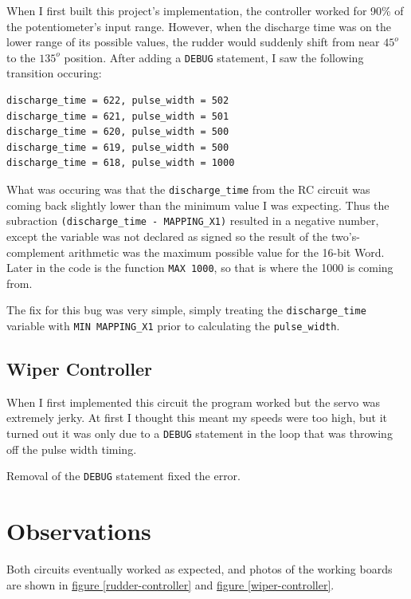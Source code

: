 \documentclass[11pt]{article}
\begin{document}
When I first built this project's implementation, the controller worked
for 90\% of the potentiometer's input range. However, when the discharge
time was on the lower range of its possible values, the rudder would
suddenly shift from near $45^{o}$ to the $135^{o}$ position.
After adding a \texttt{DEBUG} statement, I saw the following transition
occuring:
\begin{verbatim}
discharge_time = 622, pulse_width = 502
discharge_time = 621, pulse_width = 501
discharge_time = 620, pulse_width = 500
discharge_time = 619, pulse_width = 500
discharge_time = 618, pulse_width = 1000
\end{verbatim}

What was occuring was that the \texttt{discharge\_time} from the RC circuit
was coming back slightly lower than the minimum value I was expecting.
Thus the subraction \mbox{\texttt{(discharge\_time - MAPPING\_X1)}} resulted
in a negative number, except the variable was not declared as signed so
the result of the two's-complement arithmetic was the maximum possible
value for the 16-bit Word. Later in the code is the function
\mbox{\texttt{MAX 1000}}, so that is where the 1000 is coming from.

The fix for this bug was very simple, simply treating the
\texttt{discharge\_time} variable with \mbox{\texttt{MIN MAPPING\_X1}}
prior to calculating the \texttt{pulse\_width}.

\subsection{Wiper Controller}

When I first implemented this circuit the program worked but the servo
was extremely jerky. At first I thought this meant my speeds were too
high, but it turned out it was only due to a \texttt{DEBUG} statement
in the loop that was throwing off the pulse width timing.

Removal of the \texttt{DEBUG} statement fixed the error.

\section{Observations}

Both circuits eventually worked as expected, and photos of the working boards are shown in
\hyperref[rudder-controller]{figure \ref{rudder-controller}}
and \hyperref[wiper-controller]{figure \ref{wiper-controller}}.
\end{document}
